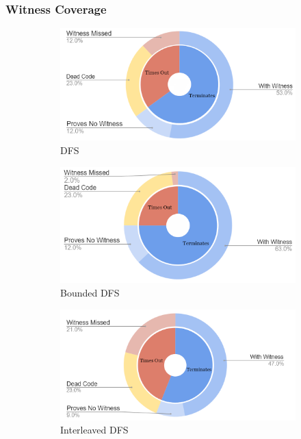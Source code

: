 \subsubsection{Witness Coverage}
\begin{figure}[h]
\centering
\begin{subfigure}{0.45\textwidth}
\centering
\includegraphics[width=1\textwidth]{Media/Figures/DFS_coverage}
\caption{DFS}
\end{subfigure}
%
\begin{subfigure}{0.45\textwidth}
\centering
\includegraphics[width=1\textwidth]{Media/Figures/BDFS_coverage}
\caption{Bounded DFS}
\end{subfigure}

\vspace{1cm}

\begin{subfigure}{0.45\textwidth}
\centering

\includegraphics[width=1\textwidth]{Media/Figures/IDFS_coverage}
\caption{Interleaved DFS}
\end{subfigure}
%
\begin{subfigure}{0.45\textwidth}
\centering


\end{subfigure}
\end{figure}
